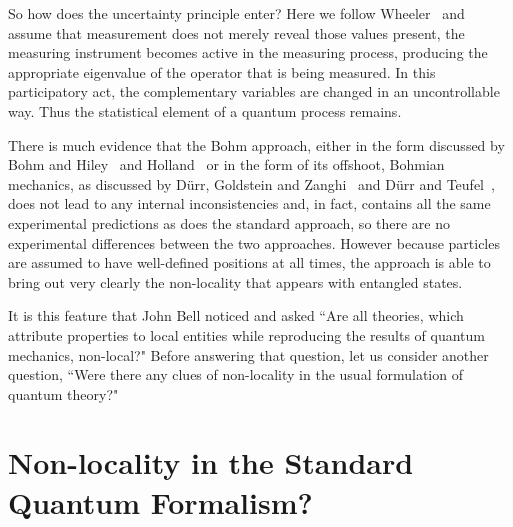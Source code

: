 \documentclass[11pt]{article}
\begin{document}
 So how does the uncertainty principle enter?  Here we follow Wheeler~\cite{jw91}
and assume that measurement does not merely reveal those values present,  the measuring instrument becomes active in the measuring process, producing the appropriate eigenvalue of the operator that is being measured.  In this participatory act, the complementary variables are changed in an uncontrollable way.  Thus the statistical element of a quantum process remains.

There is much evidence that the Bohm approach, either in the form discussed by Bohm and Hiley~\cite{dbbh93} and Holland~\cite{ph95} 
or in the form of its offshoot, Bohmian mechanics,  as discussed by  D\"{u}rr, Goldstein and Zanghi~\cite{dgz96} 
and D\"{u}rr and Teufel~\cite{ddst09}, 
does not lead to any internal inconsistencies and, in fact, contains all the same experimental predictions as does the standard approach, so there are no experimental differences between the two approaches.   However because particles are assumed to have well-defined positions at all times, the approach is able to bring out very clearly the non-locality that appears with entangled states.  

It is this feature that John Bell noticed and asked ``Are all theories, which attribute properties to local entities while reproducing the results of quantum mechanics, non-local?"  Before answering that question, let us consider another question, ``Were there any clues of non-locality in the usual formulation of quantum theory?"

\section{Non-locality in the Standard Quantum Formalism?}
 
\end{document}
